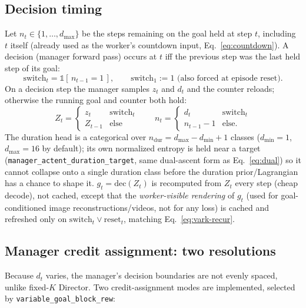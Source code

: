 \documentclass[10pt]{article}
\begin{document}
\subsection{Decision timing}
Let $n_t\in\{1,\dots,d_{\max}\}$ be the steps remaining on the goal held at
step $t$, including $t$ itself (already used as the worker's countdown input,
Eq.~\ref{eq:countdown}). A decision (manager forward pass) occurs at $t$ iff
the previous step was the last held step of its goal:
\begin{equation}
\mathrm{switch}_t = \mathbb{1}[\,n_{t-1} = 1\,], \qquad \mathrm{switch}_1 := 1
\text{ (also forced at episode reset).}
\label{eq:switch}
\end{equation}
On a decision step the manager samples $z_t$ and $d_t$ and the counter
reloads; otherwise the running goal and counter both hold:
\begin{equation}
Z_t = \begin{cases} z_t & \mathrm{switch}_t \\ Z_{t-1} & \text{else} \end{cases}
\qquad
n_t = \begin{cases} d_t & \mathrm{switch}_t \\ n_{t-1} - 1 & \text{else.} \end{cases}
\label{eq:vark-recur}
\end{equation}
The duration head is a categorical over $n_{\text{dur}} = d_{\max}-d_{\min}+1$
classes ($d_{\min}{=}1$, $d_{\max}{=}16$ by default); its own normalized
entropy is held near a target
(\texttt{manager\_actent\_duration\_target}, same dual-ascent form as
Eq.~\ref{eq:dual}) so it cannot collapse onto a single duration class before
the duration prior/Lagrangian has a chance to shape it. $g_t = \mathrm{dec}(Z_t)$
is recomputed from $Z_t$ every step (cheap decode), not cached, except that
the \emph{worker-visible rendering} of $g_t$ (used for goal-conditioned image
reconstructions/videos, not for any loss) is cached and refreshed only on
$\mathrm{switch}_t \lor \mathrm{reset}_t$, matching Eq.~\ref{eq:vark-recur}.

\subsection{Manager credit assignment: two resolutions}
\label{sec:vark-credit}
Because $d_t$ varies, the manager's decision boundaries are not evenly
spaced, unlike fixed-$K$ Director. Two credit-assignment modes are
implemented, selected by \texttt{variable\_goal\_block\_rew}:
\end{document}
